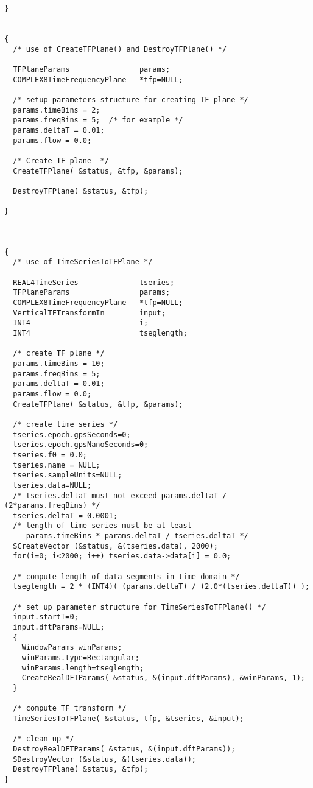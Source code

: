 \documentclass{article}
\begin{document}
\begin{verbatim}
}


{
  /* use of CreateTFPlane() and DestroyTFPlane() */

  TFPlaneParams                params;
  COMPLEX8TimeFrequencyPlane   *tfp=NULL;

  /* setup parameters structure for creating TF plane */
  params.timeBins = 2;
  params.freqBins = 5;  /* for example */
  params.deltaT = 0.01;
  params.flow = 0.0;

  /* Create TF plane  */
  CreateTFPlane( &status, &tfp, &params);

  DestroyTFPlane( &status, &tfp);

}	


  
{
  /* use of TimeSeriesToTFPlane */

  REAL4TimeSeries              tseries;
  TFPlaneParams                params;
  COMPLEX8TimeFrequencyPlane   *tfp=NULL;
  VerticalTFTransformIn        input;
  INT4                         i;
  INT4                         tseglength;

  /* create TF plane */
  params.timeBins = 10;
  params.freqBins = 5;  
  params.deltaT = 0.01;
  params.flow = 0.0;
  CreateTFPlane( &status, &tfp, &params);

  /* create time series */
  tseries.epoch.gpsSeconds=0;
  tseries.epoch.gpsNanoSeconds=0;
  tseries.f0 = 0.0;
  tseries.name = NULL;
  tseries.sampleUnits=NULL;
  tseries.data=NULL;
  /* tseries.deltaT must not exceed params.deltaT / (2*params.freqBins) */
  tseries.deltaT = 0.0001; 
  /* length of time series must be at least
     params.timeBins * params.deltaT / tseries.deltaT */
  SCreateVector (&status, &(tseries.data), 2000);
  for(i=0; i<2000; i++) tseries.data->data[i] = 0.0;

  /* compute length of data segments in time domain */  
  tseglength = 2 * (INT4)( (params.deltaT) / (2.0*(tseries.deltaT)) );

  /* set up parameter structure for TimeSeriesToTFPlane() */
  input.startT=0;
  input.dftParams=NULL;
  {
    WindowParams winParams;
    winParams.type=Rectangular;
    winParams.length=tseglength;
    CreateRealDFTParams( &status, &(input.dftParams), &winParams, 1); 
  }

  /* compute TF transform */
  TimeSeriesToTFPlane( &status, tfp, &tseries, &input);

  /* clean up */
  DestroyRealDFTParams( &status, &(input.dftParams));
  SDestroyVector (&status, &(tseries.data));
  DestroyTFPlane( &status, &tfp);
}



\end{verbatim}
\end{document}
